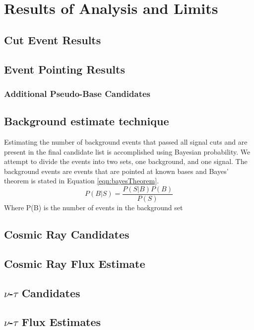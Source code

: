 			
\chapter{Results of Analysis and Limits}
\section{Cut Event Results}
	
\section{Event Pointing Results}
	\subsection{Additional Pseudo-Base Candidates}

\section{Background estimate technique}
	Estimating the number of background events that passed all signal cuts and are present in the final candidate list is accomplished using Bayesian probability.  We attempt to divide the events into two sets, one background, and one signal.  The background events are events that are pointed at known bases and   Bayes' theorem is stated in Equation \ref{eqn:bayesTheorem}.
	\begin{equation}
		P(B | S) = \frac{P(S | B) P(B)}{P(S)}
		\label{eqn:bayesTheorem}
	\end{equation}
	Where P(B) is the number of events in the background set


\section{Cosmic Ray Candidates}

\section{Cosmic Ray Flux Estimate}


\section{$\nu$-$\tau$ Candidates}

\section{$\nu$-$\tau$ Flux Estimates}
